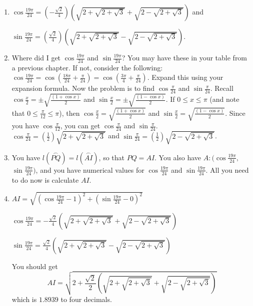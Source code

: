 \documentclass[english]{book}
\newcommand{\arc}[1]{\overset{\frown}{#1} }
\begin{document}
\begin{enumerate}
  \item[\hspace{2cm}4)] $\cos \frac{19\pi}{24} = \left( -\frac{\sqrt{2}}{4} \right) \left( \sqrt{2+\sqrt{2+\sqrt{3}}} + \sqrt{2-\sqrt{2+\sqrt{3}}} \right)$ and 
      
      $\sin \frac{19\pi}{24} = \left( \frac{\sqrt{2}}{4} \right) \left(\sqrt{2+\sqrt{2+\sqrt{3}}} - \sqrt{2-\sqrt{2+\sqrt{3}}} \right)$.
  \item[\hspace{2cm}5)] Where did I get $\cos \frac{19\pi}{24}$ and $\sin \frac{19\pi}{24}$? You may have these in your table from a previous chapter. If not, consider the following: $\cos \frac{19\pi}{24} = \cos (\frac{18\pi}{24} + \frac{\pi}{24}) = \cos (\frac{3\pi}{4} + \frac{\pi}{24})$. Expand this using your expansion formula. Now the problem is to find $\cos \frac{\pi}{24}$ and $\sin \frac{\pi}{24}$. Recall $\cos \frac{x}{2} = \pm \sqrt{\frac{(1+\cos x)}{2}}$ and $\sin \frac{x}{2} = \pm \sqrt{\frac{(1-\cos x)}{2}}$. If $0 \leq x \leq \pi$ (and note that $0 \leq \frac{\pi}{12} \leq \pi$), then $\cos \frac{x}{2} = \sqrt{\frac{(1+\cos x)}{2}}$ and $\sin \frac{x}{2} = \sqrt{\frac{(1-\cos x)}{2}}$. Since you have $\cos \frac{\pi}{12}$, you can get $\cos \frac{\pi}{24}$ and $\sin \frac{\pi}{24}$. $\cos \frac{\pi}{24} = (\frac{1}{2}) \sqrt{2+\sqrt{2+\sqrt{3}}}$ and $\sin \frac{\pi}{24} = (\frac{1}{2}) \sqrt{2-\sqrt{2+\sqrt{3}}}$.
  \item[\hspace{1cm}6)] You have $l(\arc{PQ}) = l(\arc{AI})$, so that $PQ=AI$. You also have $A:(\cos \frac{19\pi}{24},$ $\sin \frac{19\pi}{24})$, and you have numerical values for $\cos \frac{19\pi}{24}$ and $\sin \frac{19\pi}{24}$. All you need to do now is calculate $AI$.
  \item[\hspace{1cm}7)] $AI = \sqrt{(\cos \frac{19\pi}{24}-1)^{2} + (\sin \frac{19\pi}{24}-0)^{2}}$

      $\cos \frac{19\pi}{24} = -\frac{\sqrt{2}}{4} \left( \sqrt{2+\sqrt{2+\sqrt{3}}} + \sqrt{2-\sqrt{2+\sqrt{3}}} \right)$

      $\sin \frac{19\pi}{24} = \frac{\sqrt{2}}{4} \left( \sqrt{2+\sqrt{2+\sqrt{3}}} - \sqrt{2-\sqrt{2+\sqrt{3}}} \right)$

      You should get 
      \begin{equation*}
      AI = \sqrt{2+\frac{\sqrt{2}}{2} \left( \sqrt{2+\sqrt{2+\sqrt{3}}} + \sqrt{2-\sqrt{2+\sqrt{3}}} \right)}
      \end{equation*}
      which is $1.8939$ to four decimals.
\end{enumerate}
\end{document}

